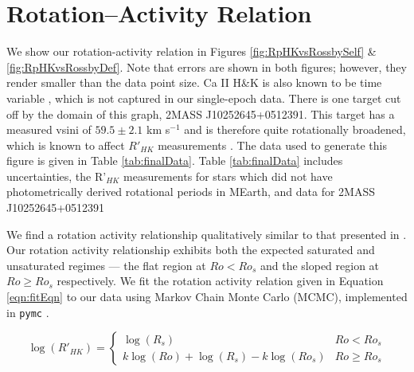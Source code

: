 \section{Rotation--Activity Relation}\label{sec:results}
We show our rotation-activity relation in Figures
\ref{fig:RpHKvsRossbySelf} \& \ref{fig:RpHKvsRossbyDef}. Note that
errors are shown in both figures; however, they render smaller than the data
point size. Ca II H\&K is also known to be time variable
\citep[e.g.][]{Baroch2020,Perdelwitz2021}, which is not captured in our
single-epoch data. There is one target cut off by the domain of this graph,
2MASS J10252645+0512391. This target has a measured vsini of $59.5\pm2.1$ km
s$^{-1}$ \citep{Kesseli2018} and is therefore quite rotationally broadened, which
is known to affect $R'_{HK}$ measurements \citep[figure 8]{Schroder2009}. The
data used to generate this figure is given in Table \ref{tab:finalData}. Table
\ref{tab:finalData} includes uncertainties, the R'$_{HK}$ measurements for
stars which did not have photometrically derived rotational periods in MEarth,
and data for 2MASS J10252645+0512391

We find a rotation activity relationship qualitatively similar to that
presented in \citet{Def17}. Our rotation activity relationship exhibits both
the expected saturated and unsaturated regimes --- the flat region at $Ro <
Ro_{s}$ and the sloped region at $Ro \geq Ro_{s}$ respectively. We fit the
rotation activity relation given in Equation \ref{eqn:fitEqn} to our data using
Markov Chain Monte Carlo (MCMC), implemented in \texttt{pymc}
\citep{Salvatier2016}. 

  \begin{equation}\label{eqn:fitEqn}
      \log(R'_{HK}) = \begin{cases}
          \log(R_{s}) & Ro < Ro_{s} \\
          k\log(Ro) + \log(R_{s}) - k\log(Ro_{s}) & Ro \geq Ro_{s}
      \end{cases}
  \end{equation}

